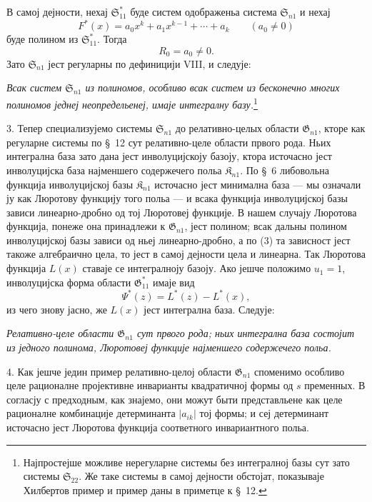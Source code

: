 ﻿\documentclass[11pt]{article}
\providecommand{\Kfield}{\mathfrak{K}}
\providecommand{\Ssys}{\mathfrak{S}}
\providecommand{\Gdom}{\mathfrak{G}}
\begin{document}
В самој дејности, нехај $\Ssys^*_{11}$ буде систем одображеньа система $\Ssys_{n1}$ и нехај
\[
  F^*(x)=a_0x^k+a_1x^{k-1}+\cdots+a_k\qquad(a_0\ne0)
\]
буде полином из $\Ssys^*_{11}$. Тогда
\begin{equation}
  R_0=a_0\ne0.
\tag{3}
\end{equation}
Зато $\Ssys_{n1}$ јест регуларны по дефиницији VIII, и следује:

{\itshape Всак систем $\Ssys_{n1}$ из полиномов, особливо всак систем из бесконечно многих полиномов једнеј неопредельенеј, имаје интегралну базу.}\footnote{Најпростејше можливе нерегуларне системы без интегралној базы сут зато системы $\Ssys_{22}$. Же таке системы в самој дејности обстојат, показываје Хилбертов пример и пример даны в приметце к \S\ 12.}

3. Тепер специализујемо системы $\Ssys_{n1}$ до релативно-целых области $\Gdom_{n1}$, кторе как регуларне системы по \S\ 12 сут релативно-целе области првого рода. Ньих интегрална база зато дана јест инволуцијскоју базоју, ктора источасно јест инволуцијска база најменшего содержечего польа $\Kfield_{n1}$. По \S\ 6 либовольна функција инволуцијској базы $\Kfield_{n1}$ источасно јест минимална база --- мы означали ју как Люротову функцију того польа --- и всака функција инволуцијској базы зависи линеарно-дробно од тој Люротовеј функције. В нашем случају Люротова функција, понеже она принадлежи к $\Gdom_{n1}$, јест полином; всак дальны полином инволуцијској базы зависи од ньеј линеарно-дробно, а по (3) та зависност јест такоже алгебраично цела, то јест в самој дејности цела и линеарна. Так Люротова функција $L(x)$ ставаје се интегралноју базоју. Ако јешче положимо $u_1=1$, инволуцијска форма области $\Gdom^*_{11}$ имаје вид
\[
  \Psi^*(z)=L^*(z)-L^*(x),
\]
из чего знову јасно, же $L(x)$ јест интегрална база. Следује:

{\itshape Релативно-целе области $\Gdom_{n1}$ сут првого рода; ньих интегрална база состојит из једного полинома, Люротовеј функције најменшего содержечего польа.}

4. Как јешче једин пример релативно-целој области $\Gdom_{n1}$ споменимо особливо целе рационалне пројективне инварианты квадратичној формы од $s$ пременных. В согласју с предходным, как знајемо, они можут быти представльене как целе рационалне комбинације детерминанта $|a_{ik}|$ тој формы; и сеј детерминант источасно јест Люротова функција соответного инвариантного польа.
\end{document}
